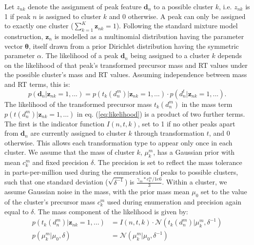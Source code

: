 Let $z_{nk}$ denote the assignment of peak feature $\textbf{d}_n$ to a possible cluster $k$, i.e. $z_{nk}$ is 1 if peak $n$ is assigned to cluster $k$ and 0 otherwise. A peak can only be assigned to exactly one cluster ($\sum_{k=1}^{K} \boldsymbol{z}_{nk}=1$). Following the standard mixture model construction, $\boldsymbol{z}_{n}$ is modelled as a multinomial distribution having the parameter vector $\boldsymbol{\theta}$, itself drawn from a prior Dirichlet distribution having the symmetric parameter $\alpha$. The likelihood of a peak $\textbf{d}_n$ being assigned to a cluster $k$ depends on the likelihood of that peak's transformed precursor mass and RT values under the possible cluster's mass and RT values. Assuming independence between mass and RT terms, this is:
\begin{equation}\label{eq:likelihood}
p(\boldsymbol{d}_n\vert\boldsymbol{z}_{nk}=1,...)=p(t_k(d_n^m)\vert\boldsymbol{z}_{nk}=1,...) \cdot p(d_n^t\vert\boldsymbol{z}_{nk}=1,...).
\end{equation}
The likelihood of the transformed precursor mass $t_k(d_n^m)$ in the mass term $p(t(d_n^m)\vert\boldsymbol{z}_{nk}=1,...)$ in eq. (\ref{eq:likelihood}) is a product of two further terms. The first is the indicator function $I(n,t, k)$, set to 1 if no other peaks apart from $\textbf{d}_n$ are currently assigned to cluster $k$ through transformation $t$, and 0 otherwise. This allows each transformation type to appear only once in each cluster. We assume that the mass of cluster $k$, $\mu_k^m$, has a Gaussian prior with mean $c_k^m$ and fixed precision $\delta$. The precision is set to reflect the mass tolerance in parts-per-million used during the enumeration of peaks to possible clusters, such that one standard deviation ($\sqrt{\delta^{-1}}$) is $\frac{\gamma_m*c_k^m/1e6}{3}$. Within a cluster, we assume Gaussian noise in the mass, with the prior mass mean $\mu_0$ set to the value of the cluster's precursor mass $c_k^m$ used during enumeration and precision again equal to $\delta$. The mass component of the likelihood is given by:
\begin{align}
p(t_k(d_n^m)\vert\boldsymbol{z}_{nk}=1,...) &= I(n,t, k) \cdot \mathcal{N}(t_k(d_n^m) \vert \mu_k^m,\delta^{-1}) \label{eq:mass-term-pc} \\
p(\mu_k^m\vert \mu_0,\delta) &= \mathcal{N}(\mu_k^m \vert \mu_0,\delta^{-1}) \label{eq:mass-prior-pc}
\end{align}
